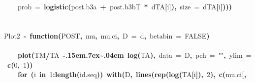 \documentclass{article}
\makeatletter
\newcommand{\hlnumber}[1]{\textcolor[rgb]{0,0,0}{#1}}%
\newcommand{\hlfunctioncall}[1]{\textcolor[rgb]{.5,0,.33}{\textbf{#1}}}%
\newcommand{\hlstring}[1]{\textcolor[rgb]{.6,.6,1}{#1}}%
\newcommand{\hlkeyword}[1]{\textbf{#1}}%
\newcommand{\hlargument}[1]{\textcolor[rgb]{.69,.25,.02}{#1}}%
\newcommand{\hlformalargs}[1]{\hlargument{#1}}%
\newcommand{\hleqformalargs}[1]{\hlargument{#1}}%
\newcommand{\hlassignement}[1]{\textbf{#1}}%
\newcommand{\hlsymbol}[1]{#1}%
\def\urltilda{\kern -.15em\lower .7ex\hbox{\~{}}\kern .04em}%
\newcommand{\hlstd}[1]{\textcolor[rgb]{0,0,0}{#1}}%
\newenvironment{kframe}{%
 \def\FrameCommand##1{\hskip\@totalleftmargin \hskip-\fboxsep
 \colorbox{shadecolor}{##1}\hskip-\fboxsep
     \hskip-\linewidth \hskip-\@totalleftmargin \hskip\columnwidth}%
 \MakeFramed {\advance\hsize-\width
   \@totalleftmargin\z@ \linewidth\hsize
   \@setminipage}}%
 {\par\unskip\endMakeFramed}
\newenvironment{knitrout}{}{} %
\makeatother
\begin{document}
\begin{knitrout}
{\begin{kframe}
\begin{flushleft}
\hlstd{}{\ }{\ }{\ }{\ }\hlargument{prob}{\ }\hlargument{=}{\ }\hlfunctioncall{logistic}\hlkeyword{(}\hlsymbol{post.b3}\hlkeyword{\usebox{\hlnormalsizeboxdollar}}\hlsymbol{a}{\ }\hlkeyword{+}{\ }\hlsymbol{post.b3}\hlkeyword{\usebox{\hlnormalsizeboxdollar}}\hlsymbol{bT}{\ }\hlkeyword{*}{\ }\hlsymbol{d}\hlkeyword{\usebox{\hlnormalsizeboxdollar}}\hlsymbol{TA}\hlkeyword{[}\hlsymbol{i}\hlkeyword{]}\hlkeyword{)}\hlkeyword{,}{\ }\hlargument{size}{\ }\hlargument{=}{\ }\hlsymbol{d}\hlkeyword{\usebox{\hlnormalsizeboxdollar}}\hlsymbol{TA}\hlkeyword{[}\hlsymbol{i}\hlkeyword{]}\hlkeyword{)}\hlkeyword{)}\hlkeyword{)}\hspace*{\fill}\\
\hlstd{}\hspace*{\fill}\\
\hlstd{}\hspace*{\fill}\\
\hlstd{}\hlsymbol{Plot2}{\ }\hlassignement{\usebox{\hlnormalsizeboxlessthan}-}{\ }\hlkeyword{function}\hlkeyword{(}\hlformalargs{POST}\hlkeyword{,}{\ }\hlformalargs{mu}\hlkeyword{,}{\ }\hlformalargs{mu.ci}\hlkeyword{,}{\ }\hlformalargs{D}{\ }\hleqformalargs{=}{\ }\hlsymbol{d}\hlkeyword{,}{\ }\hlformalargs{betabin}{\ }\hleqformalargs{=}{\ }\hlnumber{FALSE}\hlkeyword{)}{\ }\hlkeyword{\usebox{\hlnormalsizeboxopenbrace}}\hspace*{\fill}\\
\hlstd{}\hspace*{\fill}\\
\hlstd{}{\ }{\ }{\ }{\ }\hlfunctioncall{plot}\hlkeyword{(}\hlsymbol{TM}\hlkeyword{/}\hlsymbol{TA}{\ }\hlkeyword{\urltilda{}}{\ }\hlfunctioncall{log}\hlkeyword{(}\hlsymbol{TA}\hlkeyword{)}\hlkeyword{,}{\ }\hlargument{data}{\ }\hlargument{=}{\ }\hlsymbol{D}\hlkeyword{,}{\ }\hlargument{pch}{\ }\hlargument{=}{\ }\hlstring{""}\hlkeyword{,}{\ }\hlargument{ylim}{\ }\hlargument{=}{\ }\hlfunctioncall{c}\hlkeyword{(}\hlnumber{0}\hlkeyword{,}{\ }\hlnumber{1}\hlkeyword{)}\hlkeyword{)}\hspace*{\fill}\\
\hlstd{}{\ }{\ }{\ }{\ }\hlkeyword{for}{\ }\hlkeyword{(}\hlsymbol{i}{\ }\hlkeyword{in}{\ }\hlnumber{1}\hlkeyword{:}\hlfunctioncall{length}\hlkeyword{(}\hlsymbol{id.seq}\hlkeyword{)}\hlkeyword{)}{\ }\hlfunctioncall{with}\hlkeyword{(}\hlsymbol{D}\hlkeyword{,}{\ }\hlfunctioncall{lines}\hlkeyword{(}\hlfunctioncall{rep}\hlkeyword{(}\hlfunctioncall{log}\hlkeyword{(}\hlsymbol{TA}\hlkeyword{[}\hlsymbol{i}\hlkeyword{]}\hlkeyword{)}\hlkeyword{,}{\ }\hlnumber{2}\hlkeyword{)}\hlkeyword{,}{\ }\hlfunctioncall{c}\hlkeyword{(}\hlsymbol{mu.ci}\hlkeyword{[}\hlkeyword{,}\hspace*{\fill}\\

\end{flushleft}
\end{kframe}}
\end{knitrout}
\end{document}
